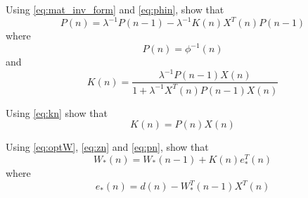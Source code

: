 \documentclass[journal,12pt,twocolumn]{IEEEtran}
\begin{document}
%
\begin{problem}
Using \eqref{eq:mat_inv_form} and \eqref{eq:phin}, show that
%
\begin{equation}
\label{eq:pn}
P(n)=\lambda ^{-1}P(n-1) - \lambda ^{-1} K(n)X^{T}(n)P(n-1)
\end{equation}
where 
\begin{equation}
P(n)=\phi ^{-1} (n)
\end{equation} and 
\begin{equation}
\label{eq:kn}
K(n) = \dfrac{\lambda ^{-1}P(n-1)X(n)}{1+ \lambda ^{-1}X^{T}(n)P(n-1)X(n)}
\end{equation}
%
\end{problem}
%
\begin{problem}
Using \eqref{eq:kn} show that
%
\begin{equation}
K(n)=P(n)X(n)
\end{equation}
\end{problem}
\begin{problem}
Using \eqref{eq:optW},  \eqref{eq:zn} and \eqref{eq:pn}, 
show that
\begin{equation}
W_*(n)=W_*(n-1)+K(n)e_{*}^{T}(n)
\end{equation}
where
\begin{equation}
e_{*}(n) = d(n)- W_*^{T}(n-1)X^{T}(n) 
\end{equation}
\end{problem}
\end{document}
